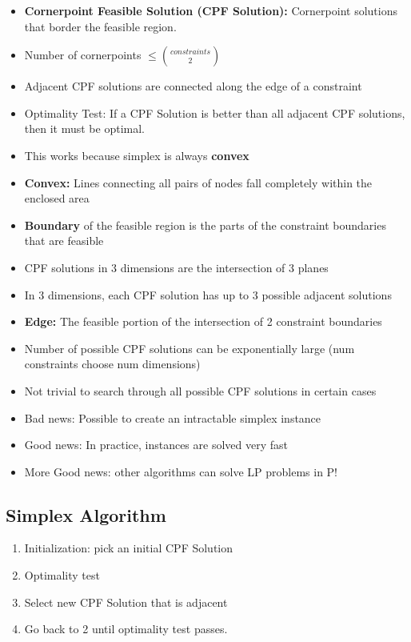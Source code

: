 \documentclass[12pt, letter]{article}
\begin{document}
\begin{itemize}
	\item \textbf{Cornerpoint Feasible Solution (CPF Solution):} Cornerpoint solutions that border the feasible region.
	\item Number of cornerpoints $\le {constraints \choose 2}$
	\item Adjacent CPF solutions are connected along the edge of a constraint
	\item Optimality Test: If a CPF Solution is better than all adjacent CPF solutions, then it must be optimal.
	\item This works because simplex is always \textbf{convex} 
	\item \textbf{Convex:} Lines connecting all pairs of nodes fall completely within the enclosed area
    \item \textbf{Boundary} of the feasible region is the parts of the constraint boundaries that are feasible
    \item CPF solutions in 3 dimensions are the intersection of 3 planes
    \item In 3 dimensions, each CPF solution has up to 3 possible adjacent solutions
    \item \textbf{Edge:} The feasible portion of the intersection of 2 constraint boundaries 
    \item Number of possible CPF solutions can be exponentially large (num constraints choose num dimensions)
    \item Not trivial to search through all possible CPF solutions in certain cases
    \item Bad news: Possible to create an intractable simplex instance
    \item Good news: In practice, instances are solved very fast
    \item More Good news: other algorithms can solve LP problems in P!
\end{itemize}

\subsection*{Simplex Algorithm}
\begin{enumerate}
	\item Initialization: pick an initial CPF Solution
	\item Optimality test
	\item Select new CPF Solution that is adjacent
	\item Go back to 2 until optimality test passes.
\end{enumerate}
\end{document}
